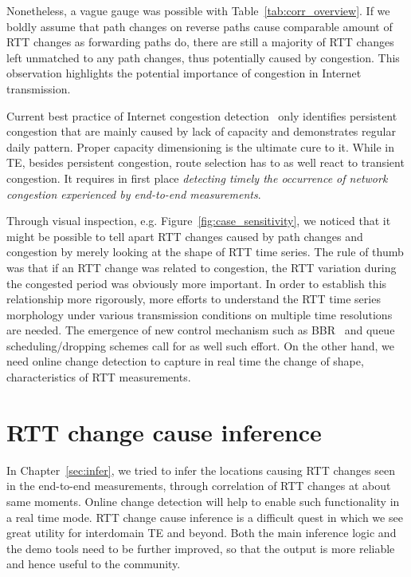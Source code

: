 Nonetheless, a vague gauge was possible with Table~\ref{tab:corr_overview}.
If we boldly assume that path changes on reverse paths cause comparable amount of RTT changes as forwarding paths do, there are still a majority of RTT changes left unmatched to any path changes, thus potentially caused by congestion. 
This observation highlights the potential importance of congestion in Internet transmission.

Current best practice of Internet congestion detection~\cite{Luckie2014} only identifies persistent congestion that are mainly caused by lack of capacity and demonstrates regular daily pattern. 
Proper capacity dimensioning is the ultimate cure to it. 
While in TE, besides persistent congestion, route selection has to as well react to transient congestion.
It requires in first place \textit{detecting timely the occurrence of network congestion experienced by end-to-end measurements}.

Through visual inspection, e.g. Figure~\ref{fig:case_sensitivity}, we noticed that it might be possible to tell apart RTT changes caused by path changes and congestion by merely looking at the shape of RTT time series. The rule of thumb was that if an RTT change was related to congestion, the RTT variation during the congested period was obviously more important. 
In order to establish this relationship more rigorously, more efforts to understand the RTT time series morphology under various transmission conditions on multiple time resolutions are needed.
The emergence of new control mechanism such as BBR~\cite{Cardwell2016, quic_cc} and queue scheduling/dropping schemes call for as well such effort.
On the other hand, we need online change detection to capture in real time the change of shape, characteristics of RTT measurements.


\section{RTT change cause inference}
In Chapter~\ref{sec:infer}, we tried to infer the locations causing RTT changes seen in the end-to-end measurements, through correlation of RTT changes at about same moments.
Online change detection will help to enable such functionality in a real time mode.
RTT change cause inference is a difficult quest in which we see great utility for interdomain TE and beyond. 
Both the main inference logic and the demo tools need to be further improved, so that the output is more reliable and hence useful to the community.

